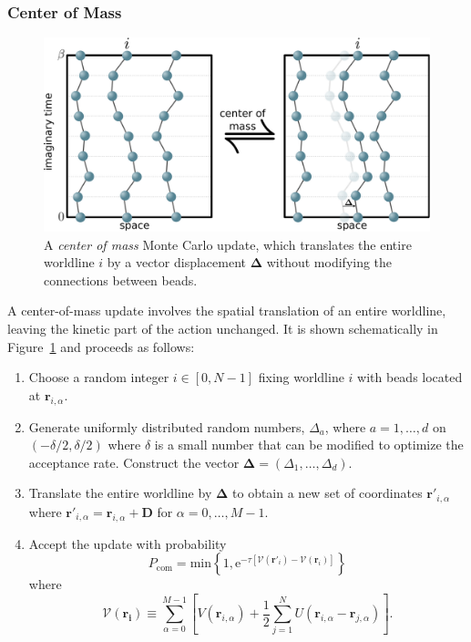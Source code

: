 \documentclass[prb,aps,amssym,nofootinbib,floatfix,notitlepage]{revtex4-1}
\renewcommand{\vec}[1]{\boldsymbol{#1}}
\newcommand{\e}[1]{\mathrm{e}^{#1}}
\begin{document}
\subsubsection{Center of Mass}
%
\begin{figure}
\begin{center}
\includegraphics[width=0.70\columnwidth]{Figures/centerofmass.pdf}
\end{center}
\caption{A \emph{center of mass} Monte Carlo update, which translates the entire
worldline $i$ by a vector displacement $\vec{\Delta}$ without modifying the
connections between beads.}
\label{fig:com}
 \end{figure}
%
A center-of-mass update involves the spatial translation of an entire
worldline, leaving the kinetic part of the action unchanged.  It is shown
schematically in Figure~\ref{fig:com} and proceeds as
follows:
\begin{enumerate}
    \item Choose a random integer $i \in [0,N-1]$ fixing worldline $i$ with beads located
        at $\vec{r}_{i,\alpha}$.
    \item Generate uniformly distributed random numbers, $\Delta_a$, where
        $a=1,\ldots,d$ on $(-\delta/2,\delta/2)$ where $\delta$ is a small number that can be
    modified to optimize the acceptance rate. Construct the vector $\vec{\Delta} =
    (\Delta_1,\ldots,\Delta_d)$.
\item Translate the entire worldline by $\vec{\Delta}$ to obtain a new set of
coordinates $\vec{r}'_{i,\alpha}$ where  $\vec{r}'_{i,\alpha} =
\vec{r}_{i,\alpha} + \vec{D}$ for $\alpha = 0,\ldots,M-1$.
\item Accept the update with probability
\begin{equation}
    P_{\text{com}} = \mathrm{min} 
    \left\{1,\e{-\tau[\mathcal{V}(\vec{r}'_i)-\mathcal{V}(\vec{r}_i)]} \right\}
\end{equation}
%
where 
%
\begin{equation}
    \mathcal{V}(\vec{r_i}) \equiv \sum_{\alpha=0}^{M-1}\left[ V(\vec{r}_{i,\alpha}) + \frac{1}{2}\sum_{j=1}^{N}
    U(\vec{r}_{i,\alpha}-\vec{r}_{j,\alpha})\right].
\end{equation}
%
\end{enumerate}
\end{document}
